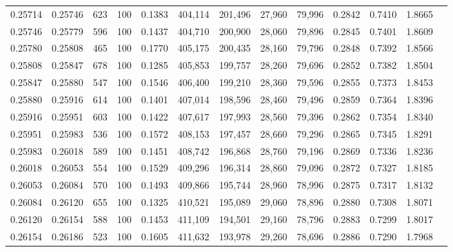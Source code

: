 \begin{tabular}{rrrrrrrrrrrrr}
0.25714 & 0.25746 &   623 & 100 &                                     0.1383 & 404,114 & 201,496 &  27,960 &  79,996 & 0.2842 & 0.7410 & 1.8665 \\
0.25746 & 0.25779 &   596 & 100 &                                     0.1437 & 404,710 & 200,900 &  28,060 &  79,896 & 0.2845 & 0.7401 & 1.8609 \\
0.25780 & 0.25808 &   465 & 100 &                                     0.1770 & 405,175 & 200,435 &  28,160 &  79,796 & 0.2848 & 0.7392 & 1.8566 \\
0.25808 & 0.25847 &   678 & 100 &                                     0.1285 & 405,853 & 199,757 &  28,260 &  79,696 & 0.2852 & 0.7382 & 1.8504 \\
0.25847 & 0.25880 &   547 & 100 &                                     0.1546 & 406,400 & 199,210 &  28,360 &  79,596 & 0.2855 & 0.7373 & 1.8453 \\
0.25880 & 0.25916 &   614 & 100 &                                     0.1401 & 407,014 & 198,596 &  28,460 &  79,496 & 0.2859 & 0.7364 & 1.8396 \\
0.25916 & 0.25951 &   603 & 100 &                                     0.1422 & 407,617 & 197,993 &  28,560 &  79,396 & 0.2862 & 0.7354 & 1.8340 \\
0.25951 & 0.25983 &   536 & 100 &                                     0.1572 & 408,153 & 197,457 &  28,660 &  79,296 & 0.2865 & 0.7345 & 1.8291 \\
0.25983 & 0.26018 &   589 & 100 &                                     0.1451 & 408,742 & 196,868 &  28,760 &  79,196 & 0.2869 & 0.7336 & 1.8236 \\
0.26018 & 0.26053 &   554 & 100 &                                     0.1529 & 409,296 & 196,314 &  28,860 &  79,096 & 0.2872 & 0.7327 & 1.8185 \\
0.26053 & 0.26084 &   570 & 100 &                                     0.1493 & 409,866 & 195,744 &  28,960 &  78,996 & 0.2875 & 0.7317 & 1.8132 \\
0.26084 & 0.26120 &   655 & 100 &                                     0.1325 & 410,521 & 195,089 &  29,060 &  78,896 & 0.2880 & 0.7308 & 1.8071 \\
0.26120 & 0.26154 &   588 & 100 &                                     0.1453 & 411,109 & 194,501 &  29,160 &  78,796 & 0.2883 & 0.7299 & 1.8017 \\
0.26154 & 0.26186 &   523 & 100 &                                     0.1605 & 411,632 & 193,978 &  29,260 &  78,696 & 0.2886 & 0.7290 & 1.7968 \\

\end{tabular}
